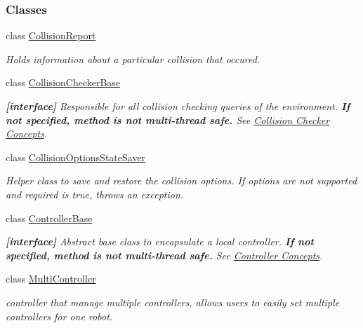 \subsubsection*{Classes}
\begin{DoxyCompactItemize}
\item 
class \hyperlink{classOpenRAVE_1_1CollisionReport}{CollisionReport}
\begin{DoxyCompactList}\small\item\em Holds information about a particular collision that occured. \item\end{DoxyCompactList}\item 
class \hyperlink{classOpenRAVE_1_1CollisionCheckerBase}{CollisionCheckerBase}
\begin{DoxyCompactList}\small\item\em {\bfseries \mbox{[}interface\mbox{]}} Responsible for all collision checking queries of the environment. {\bfseries If not specified, method is not multi-\/thread safe.} See \hyperlink{arch__collisionchecker}{Collision Checker Concepts}. \item\end{DoxyCompactList}\item 
class \hyperlink{classOpenRAVE_1_1CollisionOptionsStateSaver}{CollisionOptionsStateSaver}
\begin{DoxyCompactList}\small\item\em Helper class to save and restore the collision options. If options are not supported and required is true, throws an exception. \item\end{DoxyCompactList}\item 
class \hyperlink{classOpenRAVE_1_1ControllerBase}{ControllerBase}
\begin{DoxyCompactList}\small\item\em {\bfseries \mbox{[}interface\mbox{]}} Abstract base class to encapsulate a local controller. {\bfseries If not specified, method is not multi-\/thread safe.} See \hyperlink{arch__controller}{Controller Concepts}. \item\end{DoxyCompactList}\item 
class \hyperlink{classOpenRAVE_1_1MultiController}{MultiController}
\begin{DoxyCompactList}\small\item\em controller that manage multiple controllers, allows users to easily set multiple controllers for one robot. \item\end{DoxyCompactList}\item 

\end{DoxyCompactItemize}
